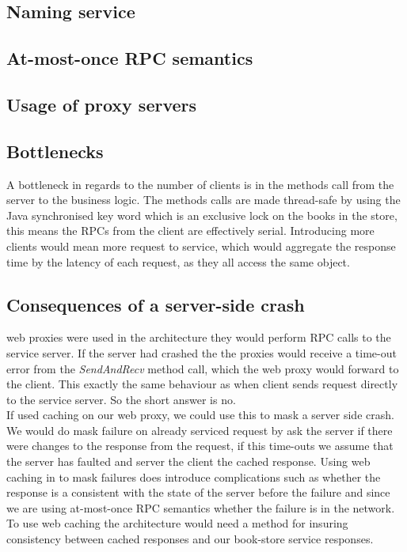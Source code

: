 \documentclass[a4paper]{article}
\begin{document}
\subsection{Naming service}

\subsection{At-most-once RPC semantics}

\subsection{Usage of proxy servers}

\subsection{Bottlenecks}
A bottleneck in regards to the number of clients is in the methods call from the server to the business logic. The methods calls are made thread-safe by using the Java synchronised key word which is an exclusive lock on the books in the store, this means the RPCs from the client are effectively serial. Introducing more clients would mean more request to service, which would aggregate the response time by the latency of each request, as they all access the same object. 
\subsection{Consequences of a server-side crash}
web proxies were used in the architecture they would perform RPC calls to the service server. If the server had crashed the the proxies would receive a time-out error from the \textit{SendAndRecv} method call, which the web proxy would forward to the client. This exactly the same behaviour as when client sends request directly to the service server. So the short answer is no.\\
If used caching on our web proxy, we could use this to mask a server side crash. We would do mask failure on already serviced request by ask the server if there were changes to the response from the request, if this time-outs we assume that the server has faulted and server the client the cached response. Using web caching in to mask failures does introduce complications such as whether the response is a consistent with the state of the server before the failure and since we are using at-most-once RPC semantics whether the failure is in the network.\\
To use web caching the architecture would need a method for insuring consistency between cached responses and our book-store service responses. 
\end{document}
